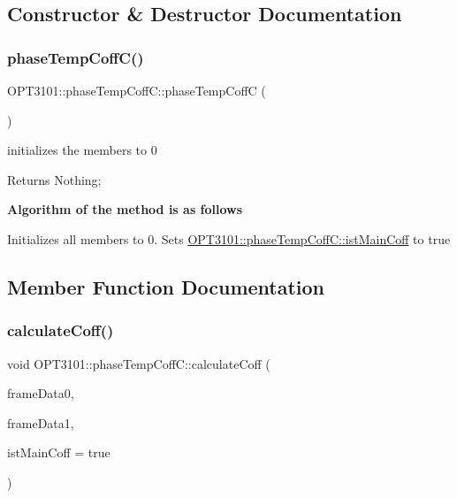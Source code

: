 \subsection{Constructor \& Destructor Documentation}
\mbox{\label{class_o_p_t3101_1_1phase_temp_coff_c_a537d187395d87831e0004e333b1e0e94}} 
\subsubsection{\texorpdfstring{phase\+Temp\+Coff\+C()}{phaseTempCoffC()}}
{\footnotesize\ttfamily O\+P\+T3101\+::phase\+Temp\+Coff\+C\+::phase\+Temp\+CoffC (\begin{DoxyParamCaption}{ }\end{DoxyParamCaption})}



initializes the members to 0 

\begin{DoxyReturn}{Returns}
Nothing; 
\end{DoxyReturn}
{\bfseries Algorithm of the method is as follows}


\begin{DoxyItemize}
\item Initializes all members to 0. Sets \mbox{\hyperlink{class_o_p_t3101_1_1phase_temp_coff_c_abcd691cfc4678e3588bc1b38600632e7}{O\+P\+T3101\+::phase\+Temp\+Coff\+C\+::ist\+Main\+Coff}} to true 
\end{DoxyItemize}

\subsection{Member Function Documentation}
\mbox{\label{class_o_p_t3101_1_1phase_temp_coff_c_a6a9ce25c87c81782b999e28c0a63a6af}} 
\subsubsection{\texorpdfstring{calculate\+Coff()}{calculateCoff()}}
{\footnotesize\ttfamily void O\+P\+T3101\+::phase\+Temp\+Coff\+C\+::calculate\+Coff (\begin{DoxyParamCaption}\item[{\mbox{\hyperlink{class_o_p_t3101_1_1frame_data}{O\+P\+T3101\+::frame\+Data}} $\ast$}]{frame\+Data0,  }\item[{\mbox{\hyperlink{class_o_p_t3101_1_1frame_data}{O\+P\+T3101\+::frame\+Data}} $\ast$}]{frame\+Data1,  }\item[{bool}]{ist\+Main\+Coff = {\ttfamily true} }\end{DoxyParamCaption})}



